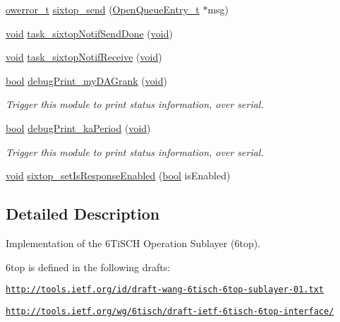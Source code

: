 \begin{DoxyCompactItemize}
\item 
\hyperlink{opendefs_8h_af20b7c3ed9d2ba19e56a309ad9314803}{owerror\+\_\+t} \hyperlink{group__sixtop_ga7e16122ce4b265f68df057c0fd852ecd}{sixtop\+\_\+send} (\hyperlink{struct_open_queue_entry__t}{Open\+Queue\+Entry\+\_\+t} $\ast$msg)
\item 
\hyperlink{usb__devapi_8h_afabf60e7f57651d6d595a02c75f07cd0}{void} \hyperlink{group__sixtop_ga7c754289c0f435249b69965524ad9368}{task\+\_\+sixtop\+Notif\+Send\+Done} (\hyperlink{usb__devapi_8h_afabf60e7f57651d6d595a02c75f07cd0}{void})
\item 
\hyperlink{usb__devapi_8h_afabf60e7f57651d6d595a02c75f07cd0}{void} \hyperlink{group__sixtop_ga04eb8f63cc93551e15143a21a6e6403e}{task\+\_\+sixtop\+Notif\+Receive} (\hyperlink{usb__devapi_8h_afabf60e7f57651d6d595a02c75f07cd0}{void})
\item 
\hyperlink{_p_e___types_8h_a97a80ca1602ebf2303258971a2c938e2}{bool} \hyperlink{group__sixtop_ga5b5d77a858a5ac83abdf678d38d059e0}{debug\+Print\+\_\+my\+D\+A\+Grank} (\hyperlink{usb__devapi_8h_afabf60e7f57651d6d595a02c75f07cd0}{void})
\begin{DoxyCompactList}\small\item\em Trigger this module to print status information, over serial. \end{DoxyCompactList}\item 
\hyperlink{_p_e___types_8h_a97a80ca1602ebf2303258971a2c938e2}{bool} \hyperlink{group__sixtop_ga1c6ef448cc665d7c6e9dd84c819d638a}{debug\+Print\+\_\+ka\+Period} (\hyperlink{usb__devapi_8h_afabf60e7f57651d6d595a02c75f07cd0}{void})
\begin{DoxyCompactList}\small\item\em Trigger this module to print status information, over serial. \end{DoxyCompactList}\item 
\hyperlink{usb__devapi_8h_afabf60e7f57651d6d595a02c75f07cd0}{void} \hyperlink{group__sixtop_ga98991c277d212918c9a9f8fb7b4edc7a}{sixtop\+\_\+set\+Is\+Response\+Enabled} (\hyperlink{_p_e___types_8h_a97a80ca1602ebf2303258971a2c938e2}{bool} is\+Enabled)
\end{DoxyCompactItemize}


\subsection{Detailed Description}
Implementation of the 6\+Ti\+S\+CH Operation Sublayer (6top). 

6top is defined in the following drafts\+:
\begin{DoxyItemize}
\item \href{http://tools.ietf.org/id/draft-wang-6tisch-6top-sublayer-01.txt}{\tt http\+://tools.\+ietf.\+org/id/draft-\/wang-\/6tisch-\/6top-\/sublayer-\/01.\+txt}
\item \href{http://tools.ietf.org/wg/6tisch/draft-ietf-6tisch-6top-interface/}{\tt http\+://tools.\+ietf.\+org/wg/6tisch/draft-\/ietf-\/6tisch-\/6top-\/interface/}
\end{DoxyItemize}

